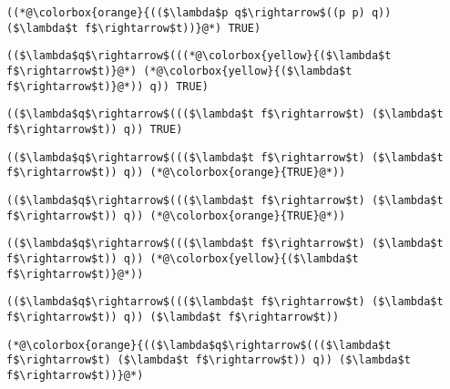 \documentclass{beamer}
\begin{document}
\begin{frame}[fragile]{\CurrentSection}
\lstset{basicstyle=\ttfamily\small}\lstset{numbers=none}\lstset{language=ML}\begin{lstlisting}
((*@\colorbox{orange}{(($\lambda$p q$\rightarrow$((p p) q)) ($\lambda$t f$\rightarrow$t))}@*) TRUE)
\end{lstlisting}
\pause\lstset{language=ML}\begin{lstlisting}
(($\lambda$q$\rightarrow$(((*@\colorbox{yellow}{($\lambda$t f$\rightarrow$t)}@*) (*@\colorbox{yellow}{($\lambda$t f$\rightarrow$t)}@*)) q)) TRUE)
\end{lstlisting}

\end{frame}

\begin{frame}[fragile]{\CurrentSection}
\lstset{basicstyle=\ttfamily\small}\lstset{numbers=none}\lstset{language=ML}\begin{lstlisting}
(($\lambda$q$\rightarrow$((($\lambda$t f$\rightarrow$t) ($\lambda$t f$\rightarrow$t)) q)) TRUE)
\end{lstlisting}
\pause\lstset{language=ML}\begin{lstlisting}
(($\lambda$q$\rightarrow$((($\lambda$t f$\rightarrow$t) ($\lambda$t f$\rightarrow$t)) q)) (*@\colorbox{orange}{TRUE}@*))
\end{lstlisting}

\end{frame}

\begin{frame}[fragile]{\CurrentSection}
\lstset{basicstyle=\ttfamily\small}\lstset{numbers=none}\lstset{language=ML}\begin{lstlisting}
(($\lambda$q$\rightarrow$((($\lambda$t f$\rightarrow$t) ($\lambda$t f$\rightarrow$t)) q)) (*@\colorbox{orange}{TRUE}@*))
\end{lstlisting}
\pause\lstset{language=ML}\begin{lstlisting}
(($\lambda$q$\rightarrow$((($\lambda$t f$\rightarrow$t) ($\lambda$t f$\rightarrow$t)) q)) (*@\colorbox{yellow}{($\lambda$t f$\rightarrow$t)}@*))
\end{lstlisting}

\end{frame}

\begin{frame}[fragile]{\CurrentSection}
\lstset{basicstyle=\ttfamily\small}\lstset{numbers=none}\lstset{language=ML}\begin{lstlisting}
(($\lambda$q$\rightarrow$((($\lambda$t f$\rightarrow$t) ($\lambda$t f$\rightarrow$t)) q)) ($\lambda$t f$\rightarrow$t))
\end{lstlisting}
\pause\lstset{language=ML}\begin{lstlisting}
(*@\colorbox{orange}{(($\lambda$q$\rightarrow$((($\lambda$t f$\rightarrow$t) ($\lambda$t f$\rightarrow$t)) q)) ($\lambda$t f$\rightarrow$t))}@*)
\end{lstlisting}

\end{frame}
\end{document}
